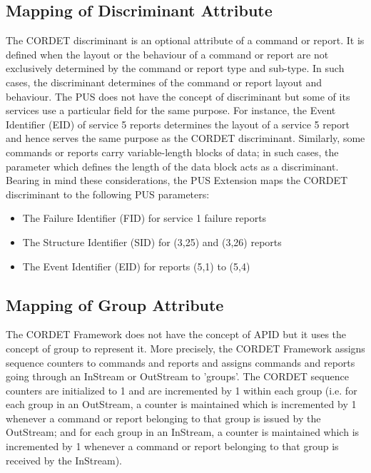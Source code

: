 \documentclass{pnp_article}
\begin{document}
\subsection{Mapping of Discriminant Attribute}\label{sec:mapDisc}
The CORDET discriminant is an optional attribute of a command or report. It is defined when the layout or the behaviour of a command or report are not exclusively determined by the command or report type and sub-type. In such cases, the discriminant determines of the command or report layout and behaviour. The PUS does not have the concept of discriminant but some of its services use a particular field for the same purpose. For instance, the Event Identifier (EID) of service 5 reports determines the layout of a service 5 report and hence serves the same purpose as the CORDET discriminant. Similarly, some commands or reports carry variable-length blocks of data; in such cases, the parameter which defines the length of the data block acts as a discriminant. Bearing in mind these considerations, the PUS Extension maps the CORDET discriminant to the following PUS parameters:

\begin{itemize}
\item The Failure Identifier (FID) for service 1 failure reports
\item The Structure Identifier (SID) for (3,25) and (3,26) reports
\item The Event Identifier (EID) for reports (5,1) to (5,4)
\end{itemize}

\subsection{Mapping of Group Attribute}\label{sec:mapGroup}
The CORDET Framework does not have the concept of APID but it uses the concept of group to represent it. More precisely, the CORDET Framework assigns sequence counters to commands and reports and assigns commands and reports going through an InStream or OutStream to 'groups'. The CORDET sequence counters are initialized to 1 and are incremented by 1 within each group (i.e. for each group in an OutStream, a counter is maintained which is incremented by 1 whenever a command or report belonging to that group is issued by the OutStream; and for each group in an InStream, a counter is maintained which is incremented by 1 whenever a command or report belonging to that group is received by the InStream). 
\end{document}
